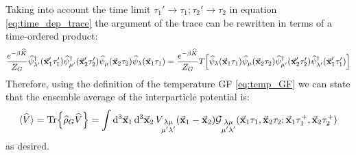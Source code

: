 \documentclass[a4paper]{article}
\newcommand{\meanv}[1]{\langle #1 \rangle}
\renewcommand{\hat}{\widehat}
\begin{document}
Taking into account the time limit $\tau_1'\rightarrow\tau_1; \tau_2'\rightarrow\tau_2$ in equation \eqref{eq:time_dep_trace} the argument of the trace can be rewritten in terms of a time-ordered product:
\begin{equation}
\frac{e^{-\beta\hat{K}}}{Z_G}
\hat{\psi}_{\lambda'}^\dag(\va{x}_1'\tau_1') \hat{\psi}_{\mu'}^\dag(\va{x}_2'\tau_2')
\hat{\psi}_\mu(\va{x}_2\tau_2) \hat{\psi}_\lambda(\va{x}_1\tau_1)
 = \frac{e^{-\beta\hat{K}}}{Z_G} T\bqty{
\hat{\psi}_\lambda(\va{x}_1\tau_1) \hat{\psi}_\mu(\va{x}_2\tau_2) 
\hat{\psi}_{\mu'}^\dag(\va{x}_2'\tau_2') \hat{\psi}_{\lambda'}^\dag(\va{x}_1'\tau_1')
 }
\end{equation}
Therefore, using the definition of the temperature GF \eqref{eq:temp_GF} we can state that the ensemble average of the interparticle potential is:
\begin{equation}
\meanv{\hat{V}} = \Tr{\hat{\rho}_G\hat{V}} = \int\dd[3]{\va{x}_1}\dd[3]{\va{x}_2} V_{\substack{\lambda\mu\\\mu'\lambda'}}(\va{x}_1 - \va{x}_2)
\mathcal{G}_{\substack{\lambda\mu\\\mu'\lambda'}}(\va{x}_1\tau_1,\va{x}_2\tau_2;\va{x}_1\tau_1^+,\va{x}_2\tau_2^+)
\end{equation}
as desired.
\end{document}
